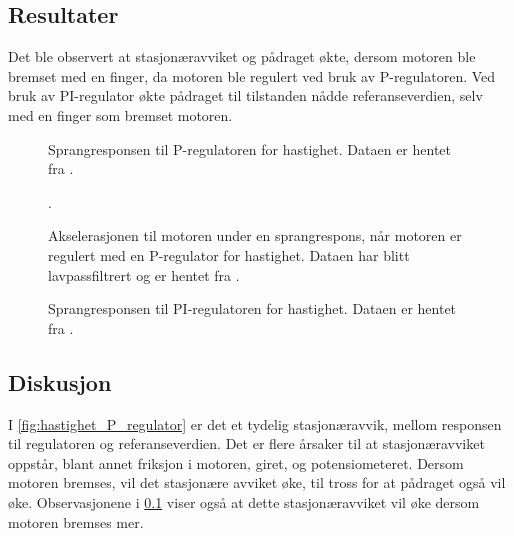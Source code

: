 \subsection{Resultater}

\label{obs:hastighet_regulator_breming_med_finger}
Det ble observert at stasjonæravviket og pådraget økte, dersom motoren ble bremset med en finger, da motoren ble regulert ved bruk av P-regulatoren. Ved bruk av PI-regulator økte pådraget til tilstanden nådde referanseverdien, selv med en finger som bremset motoren.

\begin{figure}[h]
    \centering
    
    \caption{Sprangresponsen til P-regulatoren for hastighet. Dataen er hentet fra \cite{EksempelData}.}
    \label{fig:hastighet_P_regulator}
\end{figure}

\begin{figure}[h]
    \centering
    
    \caption{
        Akselerasjonen til motoren under en sprangrespons, når motoren er regulert med en P-regulator for hastighet.
        Dataen har blitt lavpassfiltrert og er hentet fra \cite{EksempelData}.
    }.
    \label{fig:hastighet_P_regulator_derivert}
\end{figure}

\begin{figure}[h]
    \centering
    
    \caption{Sprangresponsen til PI-regulatoren for hastighet. Dataen er hentet fra \cite{EksempelData}.}
    \label{fig:hastighet_PI_regulator}
\end{figure}






\subsection{Diskusjon}

I \autoref{fig:hastighet_P_regulator} er det et tydelig stasjonæravvik, mellom responsen til regulatoren og referanseverdien. Det er flere årsaker til at stasjonæravviket oppstår, blant annet friksjon i motoren, giret, og potensiometeret. Dersom motoren bremses, vil det stasjonære avviket øke, til tross for at pådraget også vil øke. Observasjonene i \ref{obs:hastighet_regulator_breming_med_finger} viser også at dette stasjonæravviket vil øke dersom motoren bremses mer.


